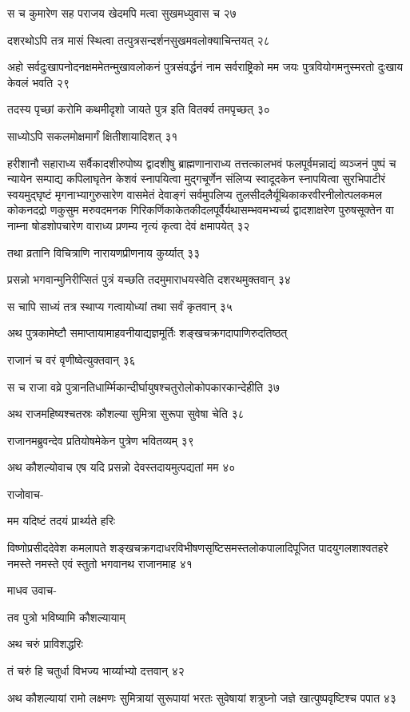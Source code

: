 स च कुमारेण सह पराजय खेदमपि मत्वा सुखमध्युवास च २७

दशरथोऽपि तत्र मासं स्थित्वा तत्पुत्रसन्दर्शनसुखमवलोक्याचिन्तयत् २८

अहो सर्वदुःखापनोदनक्षममेतन्मुखावलोकनं पुत्रसंवर्द्धनं नाम सर्वराष्ट्रिको मम जयः
पुत्रवियोगमनुस्मरतो दुःखाय केवलं भवति २९

तदस्य पृच्छां करोमि कथमीदृशो जायते पुत्र इति वितर्क्य तमपृच्छत् ३०

साध्योऽपि सकलमोक्षमार्गं क्षितीशायादिशत् ३१

हरीशानौ सहाराध्य सर्वैकादशीरुपोष्य द्वादशीषु ब्राह्मणानाराध्य तत्तत्कालभवं
फलपूर्वमन्नाद्यं व्यञ्जनं पुष्पं च न्यायेन सम्पाद्य कपिलाघृतेन केशवं स्नापयित्वा मुद्गचूर्णेन संलिप्य
स्वादूदकेन स्नापयित्वा सुरभिपाटीरं स्वयमुद्घृष्टं मृगनाभ्यागुरुसारेण वासमेतं देवाङ्गं सर्वमुपलिप्य
तुलसीदलैर्यूथिकाकरवीरनीलोत्पलकमल कोकनदद्रो णकुसुम मरुवदमनक
गिरिकर्णिकाकेतकीदलपूर्वैर्यथासम्भवमभ्यर्च्य द्वादशाक्षरेण पुरुषसूक्तेन वा नाम्ना षोडशोपचारेण
वाराध्य प्रणम्य नृत्यं कृत्वा देवं क्षमापयेत् ३२

तथा व्रतानि विचित्राणि नारायणप्रीणनाय कुर्य्यात् ३३

प्रसन्नो भगवान्मुनिरीप्सितं पुत्रं यच्छति तदमुमाराधयस्वेति दशरथमुक्तवान् ३४

स चापि साध्यं तत्र स्थाप्य गत्वायोध्यां तथा सर्वं कृतवान् ३५

अथ पुत्रकामेष्टौ समाप्तायामाहवनीयाद्यज्ञमूर्तिः शङ्खचक्रगदापाणिरुदतिष्ठत्

राजानं च वरं वृणीष्वेत्युक्तवान् ३६

स च राजा वव्रे पुत्रानतिधार्म्मिकान्दीर्घायुषश्चतुरोलोकोपकारकान्देहीति ३७

अथ राजमहिष्यश्चतस्रः कौशल्या सुमित्रा सुरूपा सुवेषा चेति ३८

राजानमब्रुवन्देव प्रतियोषमेकेन पुत्रेण भवितव्यम् ३९

अथ कौशल्योवाच एष यदि प्रसन्नो देवस्तदायमुत्पद्यतां मम ४०

राजोवाच-

मम यदिष्टं तदयं प्रार्थ्यते हरिः

विष्णोप्रसीददेवेश कमलापते शङ्खचक्रगदाधरविभीषणसृष्टिसमस्तलोकपालादिपूजित पादयुगलशाश्वतहरे
नमस्ते नमस्ते एवं स्तुतो भगवानथ राजानमाह ४१

माधव उवाच-

तव पुत्रो भविष्यामि कौशल्यायाम्

अथ चरुं प्राविशद्धरिः

तं चरुं हि चतुर्धा विभज्य भार्य्याभ्यो दत्तवान् ४२

अथ कौशल्यायां रामो लक्ष्मणः सुमित्रायां सुरूपायां भरतः सुवेषायां शत्रुघ्नो जज्ञे
खात्पुष्पवृष्टिश्च पपात ४३

